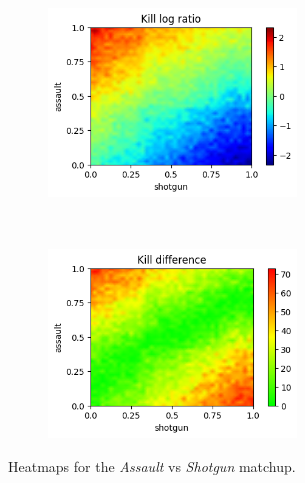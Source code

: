\begin{figure}[H]
    \centering
    \begin{subfigure}[t]{0.5\textwidth}
        \centering
        \includegraphics[height=5cm]{Images/images/heatmaps/mid-range/assault_shotgun_heatmap_ratio.png}
    \end{subfigure}%
    ~ 
    \begin{subfigure}[t]{0.5\textwidth}
        \centering
        \includegraphics[height=5cm]{Images/images/heatmaps/mid-range/assault_shotgun_heatmap_diff.png}
    \end{subfigure}
    \caption{Heatmaps for the \textit{Assault} vs \textit{Shotgun} matchup.}
    \label{fig:balance_assault_shotgun_mid}
\end{figure}

